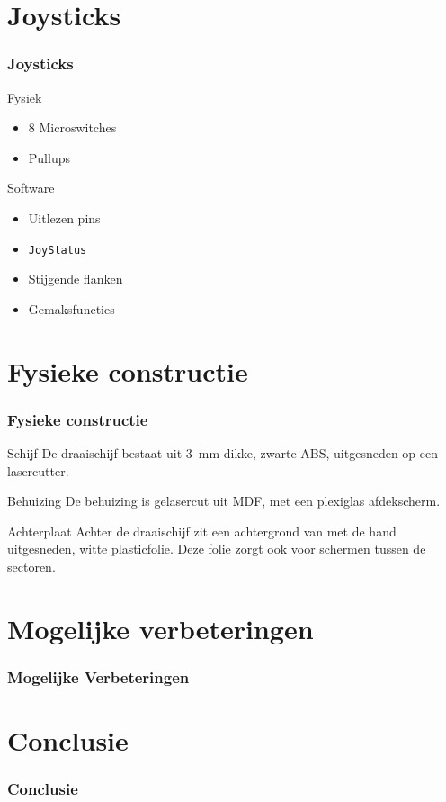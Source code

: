 \documentclass{beamer}
\begin{document}
\section{Joysticks}
\begin{frame}
  \frametitle{Joysticks}

  \begin{block}{Fysiek}
    \begin{itemize}
    \item 8 Microswitches
    \item Pullups
    \end{itemize}
  \end{block}

  \begin{block}{Software}
    \begin{itemize}
    \item Uitlezen pins
    \item \texttt{JoyStatus}
    \item Stijgende flanken
    \item Gemaksfuncties
    \end{itemize}
  \end{block}
\end{frame}

\section{Fysieke constructie}
\begin{frame}
  \frametitle{Fysieke constructie}

  \begin{block}{Schijf}
    De draaischijf bestaat uit \SI{3}{\milli\metre} dikke, zwarte ABS,
    uitgesneden op een lasercutter.
  \end{block}

  \begin{block}{Behuizing}
    De behuizing is gelasercut uit MDF, met een plexiglas afdekscherm.
  \end{block}

  \begin{block}{Achterplaat}
    Achter de draaischijf zit een achtergrond van met de hand uitgesneden, witte
    plasticfolie. Deze folie zorgt ook voor schermen tussen de sectoren.
  \end{block}
\end{frame}

\section{Mogelijke verbeteringen}
\begin{frame}
  \frametitle{Mogelijke Verbeteringen}
  
\end{frame}

\section{Conclusie}
\begin{frame}
  \frametitle{Conclusie}
  
\end{frame}
\end{document}
